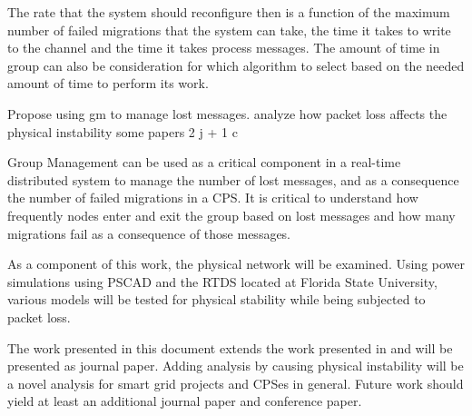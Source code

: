 The rate that the system should reconfigure then is a function of the maximum number of failed migrations that the system can take, the time it takes to write to the channel and the time it takes process messages. The amount of time in group can also be consideration for which algorithm to select based on the needed amount of time to perform its work.

Propose
    using gm to manage lost messages.
    analyze how packet loss affects the physical instability
    some papers 2 j + 1 c

Group Management can be used as a critical component in a real-time distributed system to manage the number of lost messages, and as a consequence the number of failed migrations in a CPS. It is critical to understand how frequently nodes enter and exit the group based on lost messages and how many migrations fail as a consequence of those messages.

As a component of this work, the physical network will be examined. Using power simulations using PSCAD and the RTDS located at Florida State University, various models will be tested for physical stability while being subjected to packet loss.

The work presented in this document extends the work presented in \cite{CRITIS2012} and will be presented as journal paper. Adding analysis by causing physical instability will be a novel analysis for smart grid projects and CPSes in general. Future work should yield at least an additional journal paper and conference paper.

